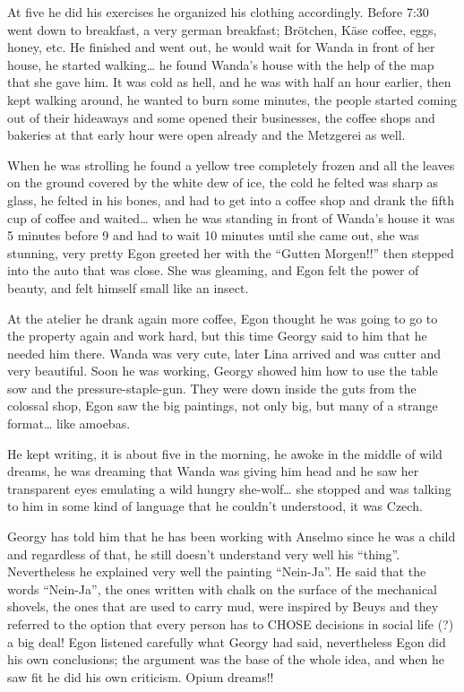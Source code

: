 \documentclass[smalldemyvopaper,11pt,twoside,onecolumn,openright,extrafontsizes]{memoir}
\begin{document}
At five he did his exercises he organized his clothing accordingly. Before 7:30 went down to breakfast, a very german breakfast; Brötchen, Käse coffee, eggs, honey, etc. He finished and went out, he would wait for Wanda in front of her house, he started walking… he found Wanda’s house with the help of the map that she gave him. It was cold as hell, and he was with half an hour earlier, then kept walking around, he wanted to burn some minutes, the people started coming out of their hideaways and some opened their businesses, the coffee shops and bakeries at that early hour were open already and the Metzgerei as well.

When he was strolling he found a yellow tree completely frozen and all the leaves on the ground covered by the white dew of ice, the cold he felted was sharp as glass, he felted in his bones, and had to get into a coffee shop and drank the fifth cup of coffee and waited… when he was standing in front of Wanda’s house it was 5 minutes before 9 and had to wait 10 minutes until she came out, she was stunning, very pretty Egon greeted her with the “Gutten Morgen!!” then stepped into the auto that was close. She was gleaming, and Egon felt the power of beauty, and felt himself small like an insect.

At the atelier he drank again more coffee, Egon thought he was going to go to the property again and work hard, but this time Georgy said to him that he needed him there. Wanda was very cute, later Lina arrived and was cutter and very beautiful. Soon he was working, Georgy showed him how to use the table sow and the pressure-staple-gun. They were down inside the guts from the colossal shop, Egon saw the big paintings, not only big, but many of a strange format… like amoebas. 

\ornamentbreak

He kept writing, it is about five in the morning, he awoke in the middle of wild dreams, he was dreaming that Wanda was giving him head and he saw her transparent eyes emulating a wild hungry she-wolf… she stopped and was talking to him in some kind of language that he couldn’t understood, it was Czech. 

Georgy has told him that he has been working with Anselmo since he was a child and regardless of that, he still doesn’t understand very well his “thing”. Nevertheless he explained very well the painting “Nein-Ja”. He said that the words “Nein-Ja”, the ones written with chalk on the surface of the mechanical shovels, the ones that are used to carry mud, were inspired by Beuys and they referred to the option that every person has to CHOSE decisions in social life (?) a big deal! Egon listened carefully what Georgy had said, nevertheless Egon did his own conclusions; the argument was the base of the whole idea, and when he saw fit he did his own criticism. Opium dreams!!
\end{document}
